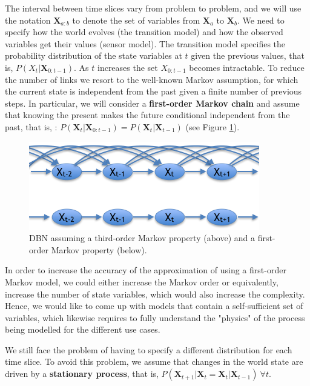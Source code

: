 The interval between time slices vary from problem to problem, and we will use the notation $\bm X_{a:b}$ to denote the set of variables from $\bm X_a$ to $\bm X_b$. We need to specify how the world evolves (the transition model) and how the observed variables get their values (sensor model). The transition model specifies the probability distribution of the state variables at $t$ given the previous values, that is, $P(X_t|\bm X_{0:t-1})$. As $t$ increases the set $X_{0:t-1}$ becomes intractable. To reduce the number of links we resort to the well-known Markov assumption, for which the current state is independent from the past given a finite number of previous steps. In particular, we will consider a \textbf{first-order Markov chain} and assume that knowing the present makes the future conditional independent from the past, that is, : $P(\bm X_t|\bm X_{0:t-1}) = P(\bm X_t|\bm X_{t-1})$ (see Figure \ref{Figure:markovChain}).

\begin{figure}
\begin{center}
\includegraphics[scale=0.56]{./figures/PreliminariesMarkovChain}
\caption{\label{Figure:markovChain}DBN assuming a third-order Markov property (above) and a first-order Markov property (below).
}
\end{center}
\end{figure}

In order to increase the accuracy of the approximation of using a first-order Markov model, we could either increase the Markov order or equivalently, increase the number of state variables, which would also increase the complexity. Hence, we would like to come up with models that contain a self-sufficient set of variables, which likewise requires to fully understand the "physics" of the process being modelled for the different use cases. 


We still face the problem of having to specify a different distribution for each time slice. To avoid this problem, we assume that changes in the world state are driven by a \textbf{stationary process}, that is, $P(\bm X_{t+1}|\bm X_{t} =\bm X_t|\bm X_{t-1})\ \forall t$.


